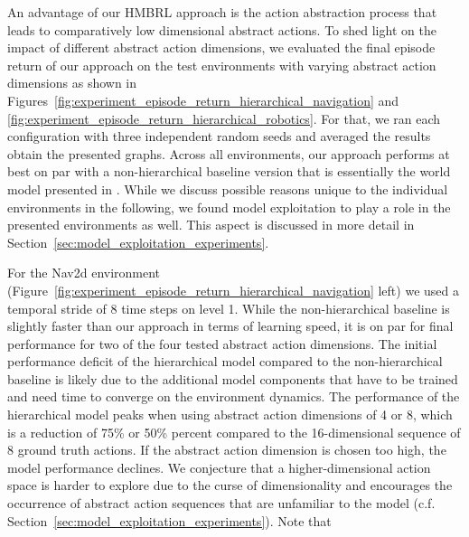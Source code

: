 \documentclass{article}
\begin{document}
An advantage of our HMBRL approach is the action abstraction process that leads to comparatively low dimensional abstract actions. To shed light on the impact of different abstract action dimensions, we evaluated the final episode return of our approach on the test environments with varying abstract action dimensions as shown in Figures~\ref{fig:experiment_episode_return_hierarchical_navigation} and \ref{fig:experiment_episode_return_hierarchical_robotics}. For that, we ran each configuration with three independent random seeds and averaged the results obtain the presented graphs. Across all environments, our approach performs at best on par with a non-hierarchical baseline version that is essentially the world model presented in \citet{hafner2020dream}. While we discuss possible reasons unique to the individual environments in the following, we found model exploitation to play a role in the presented environments as well. This aspect is discussed in more detail in Section~\ref{sec:model_exploitation_experiments}.

For the Nav2d environment (Figure~\ref{fig:experiment_episode_return_hierarchical_navigation} left) we used a temporal stride of 8 time steps on level 1. While the non-hierarchical baseline is slightly faster than our approach in terms of learning speed, it is on par for final performance for two of the four tested abstract action dimensions. The initial performance deficit of the hierarchical model compared to the non-hierarchical baseline is likely due to the additional model components that have to be trained and need time to converge on the environment dynamics. The performance of the hierarchical model peaks when using abstract action dimensions of 4 or 8, which is a reduction of 75\% or 50\% percent compared to the 16-dimensional sequence of 8 ground truth actions. If the abstract action dimension is chosen too high, the model performance declines. We conjecture that a higher-dimensional action space is harder to explore due to the curse of dimensionality and encourages the occurrence of abstract action sequences that are unfamiliar to the model (c.f. Section~\ref{sec:model_exploitation_experiments}). Note that 
\end{document}
